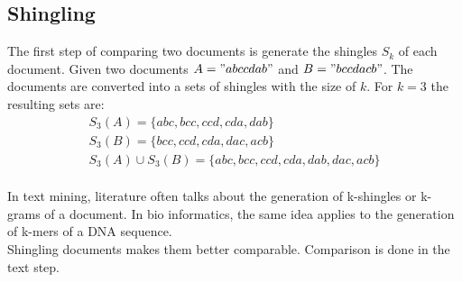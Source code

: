 \subsection{Shingling}

The first step of comparing two documents is generate the shingles $ S_k $ of each document. Given two documents $ A = "abccdab" $ and $ B = "bccdacb" $. The documents are  converted into a sets of shingles with the size of $ k $. For $ k = 3 $ the resulting sets are: \\

\begin{equation}
    \begin{split}
        S_3(A) = \{abc, bcc, ccd, cda, dab\} \\
        S_3(B) = \{bcc, ccd, cda, dac, acb\} \\
        S_3(A) \cup S_3(B) = \{abc, bcc, ccd, cda, dab, dac, acb\}
    \end{split}
\end{equation}\\

In text mining, literature often talks about the generation of k-shingles or k-grams of a document. In bio informatics, the same idea applies to the generation of k-mers of a DNA sequence.\\

Shingling documents makes them better comparable. Comparison is done in the text step.\\